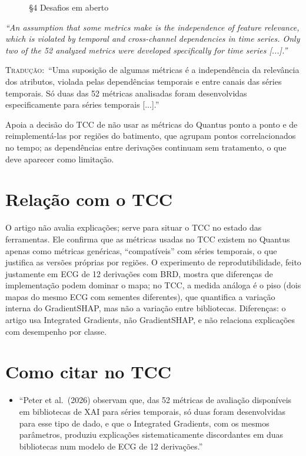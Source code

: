 \documentclass[11pt,a4paper]{article}
\newcommand{\pagechip}[1]{{\setlength{\fboxsep}{1.5pt}\colorbox{cAcc}{\textcolor{white}{\scriptsize\texttt{#1}}}}}
\newenvironment{origquote}{\par\itshape\small}{\par}
\newenvironment{tradquote}{\par\small\textsc{Tradução:}\ }{\par}
\newcommand{\explab}[1]{\par\smallskip{\small\color{cAcc}\textbf{\MakeUppercase{#1}}}\par}
\begin{document}
\begin{citacard}{\pagechip{p. 12} §4 Desafios em aberto}
\begin{origquote}“An assumption that some metrics make is the independence of feature relevance, which is violated by temporal and cross-channel dependencies in time series. Only two of the 52 analyzed metrics were developed specifically for time series [...].”\end{origquote}
\begin{tradquote}“Uma suposição de algumas métricas é a independência da relevância dos atributos, violada pelas dependências temporais e entre canais das séries temporais. Só duas das 52 métricas analisadas foram desenvolvidas especificamente para séries temporais [...].”\end{tradquote}
\explab{Explicação}
Apoia a decisão do TCC de não usar as métricas do Quantus ponto a ponto e de reimplementá-las por regiões do batimento, que agrupam pontos correlacionados no tempo; as dependências entre derivações continuam sem tratamento, o que deve aparecer como limitação.
\end{citacard}

\section{Relação com o TCC}
O artigo não avalia explicações; serve para situar o TCC no estado das ferramentas. Ele confirma que as métricas usadas no TCC existem no Quantus apenas como métricas genéricas, ``compatíveis'' com séries temporais, o que justifica as versões próprias por regiões. O experimento de reprodutibilidade, feito justamente em ECG de 12 derivações com BRD, mostra que diferenças de implementação podem dominar o mapa; no TCC, a medida análoga é o piso (dois mapas do mesmo ECG com sementes diferentes), que quantifica a variação interna do GradientSHAP, mas não a variação entre bibliotecas. Diferenças: o artigo usa Integrated Gradients, não GradientSHAP, e não relaciona explicações com desempenho por classe.

\section{Como citar no TCC}
\begin{itemize}
\item ``Peter et al.\ (2026) observam que, das 52 métricas de avaliação disponíveis em bibliotecas de XAI para séries temporais, só duas foram desenvolvidas para esse tipo de dado, e que o Integrated Gradients, com os mesmos parâmetros, produziu explicações sistematicamente discordantes em duas bibliotecas num modelo de ECG de 12 derivações.''
\end{itemize}
\end{document}
